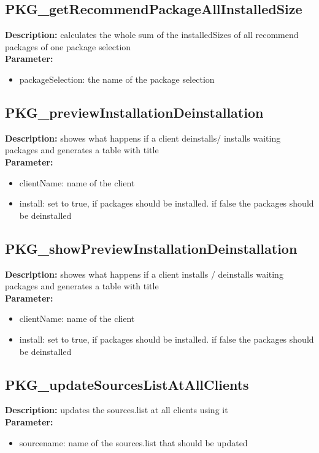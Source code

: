 \subsection{PKG\_getRecommendPackageAllInstalledSize}
\textbf{Description:} calculates the whole sum of the installedSizes of all recommend packages of one package selection\\
\textbf{Parameter:}
\begin{itemize}
\item packageSelection: the name of the package selection
\end{itemize}

\subsection{PKG\_previewInstallationDeinstallation}
\textbf{Description:} showes what happens if a client deinstalls/ installs waiting packages and generates a table with title\\
\textbf{Parameter:}
\begin{itemize}
\item clientName: name of the client
\item install: set to true, if packages should be installed. if false the packages should be deinstalled
\end{itemize}

\subsection{PKG\_showPreviewInstallationDeinstallation}
\textbf{Description:} showes what happens if a client installs / deinstalls waiting packages and generates a table with title\\
\textbf{Parameter:}
\begin{itemize}
\item clientName: name of the client
\item install: set to true, if packages should be installed. if false the packages should be deinstalled
\end{itemize}

\subsection{PKG\_updateSourcesListAtAllClients}
\textbf{Description:} updates the sources.list at all clients using it\\
\textbf{Parameter:}
\begin{itemize}
\item sourcename: name of the sources.list that should be updated
\end{itemize}

